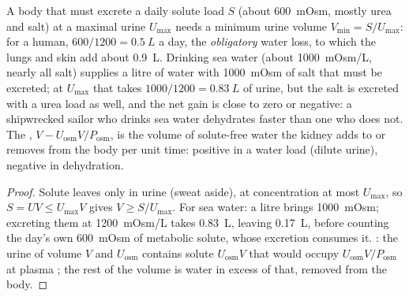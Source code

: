 \begin{proposition}\label{prop:b3:renal-osmoregulation:water}
A body that must excrete a daily solute load $S$ (about
\qty{600}{mOsm}, mostly urea and salt) at a maximal urine 
$U_{\max}$ needs a minimum urine volume $V_{\min} = S/U_{\max}$: for a
human, $600/1200 = \qty{0.5}{L}$ a day, the \emph{obligatory} water
loss, to which the lungs and skin add about \qty{0.9}{L}. Drinking
sea water (about \qty{1000}{mOsm/L}, nearly all salt) supplies a litre
of water with \qty{1000}{mOsm} of salt that must be excreted; at
$U_{\max}$ that takes $1000/1200 = \qty{0.83}{L}$ of urine, but the
salt is excreted with a urea load as well, and the net gain is close
to zero or negative: a shipwrecked sailor who drinks sea water
dehydrates faster than one who does not. The \emph{}, $V - U_{\text{osm}}V/P_{\text{osm}}$, is the volume of
solute-free water the kidney adds to or removes from the body per unit
time: positive in a water load (dilute urine), negative in
dehydration.
\end{proposition}
\begin{proof}
Solute leaves only in urine (sweat aside), at concentration at most
$U_{\max}$, so $S = U V \le U_{\max}V$ gives $V \ge S/U_{\max}$. For sea
water: a litre brings \qty{1000}{mOsm}; excreting them at
\qty{1200}{mOsm/L} takes \qty{0.83}{L}, leaving \qty{0.17}{L}, before
counting the day's own \qty{600}{mOsm} of metabolic solute, whose
excretion consumes it. : the urine of volume $V$
and  $U_{\text{osm}}$ contains solute $U_{\text{osm}}V$ that
would occupy $U_{\text{osm}}V/P_{\text{osm}}$ at plasma ; the
rest of the volume is water in excess of that, removed from the body.
\end{proof}

